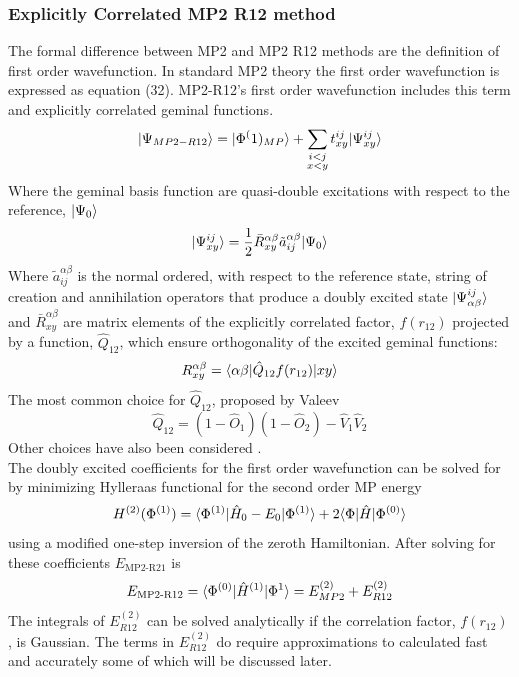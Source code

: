     \subsubsection{Explicitly Correlated MP2 R12 method}
      The formal difference between MP2 and MP2 R12 methods are the definition of first order wavefunction.  In standard MP2 theory the first order wavefunction is expressed as equation (32).  MP2-R12's first order wavefunction includes this term and explicitly correlated geminal functions.
        \begin{equation}
          | \Psi_{MP2-R12} \rangle = | \Phi^(1)_{MP} \rangle + \sum_{\substack{i<j \\ x<y}} t^{ij}_{xy} | \Psi^{ij}_{xy} \rangle
        \end{equation}
      Where the geminal basis function are quasi-double excitations with respect to the reference, $| \Psi_0 \rangle$
        \begin{equation}
        | \Psi^{ij}_{xy} \rangle = \frac{1}{2} \bar{R}^{\alpha \beta}_{xy} \tilde{a}^{\alpha \beta}_{i j} | \Psi_0 \rangle
        \end{equation}
      Where $\tilde{a}^{\alpha\beta}_{ij}$ is the normal ordered, with respect to the reference state, string of creation and annihilation operators that produce a doubly excited state $| \Psi^{ij}_{\alpha\beta} \rangle$ and $\bar{R}^{\alpha\beta}_{xy}$ are matrix elements of the explicitly correlated factor, $f(r_{12})$ projected by a function, $\hat{Q}_{12}$, which ensure orthogonality of the excited geminal functions:
        \begin{equation}
          R^{\alpha \beta}_{xy} = \langle\alpha \beta | \hat{Q}_{12} f(r_{12})| xy \rangle
        \end{equation}
      The most common choice for $\hat{Q}_{12}$, proposed by Valeev\cite{Valeev 2004} 
        \begin{equation}
          \hat{Q}_{12} = (1-\hat{O}_1)(1-\hat{O}_2)- \hat{V}_1 \hat{V}_2
        \end{equation}
      Other choices have also been considered \cite{wind 2002, Koppler 2002}.\\
      The doubly excited coefficients for the first order wavefunction can be solved for by minimizing Hylleraas functional for the second order MP energy 
        \begin{equation}
          H^{(2)} (\Phi^{(1)}) = \langle\Phi^{(1)} | \hat{H}_0 - E_0 | \Phi^{(1)} \rangle + 2 \langle\Phi |\hat{H}| \Phi^{(0)} \rangle
        \end{equation}
      using a modified one-step inversion of the zeroth Hamiltonian.  After solving for these coefficients $E_{\text{MP2-R21}}$ is 
        \begin{equation}
          E_{\text{MP2-R12}} = \langle\Phi^{(0)} | \hat{H}^{(1)} | \Phi^{1} \rangle = E^{(2)}_{MP2} + E^{(2)}_{R12}
        \end{equation}
      The integrals of $E^{(2)}_{R12}$ can be solved analytically if the correlation factor, $f(r_{12})$, is Gaussian\cite{Polly 2006}.  The terms in $E^{(2)}_{R12}$ do require approximations to calculated fast and accurately some of which will be discussed later\cite{Kong 2012}.

